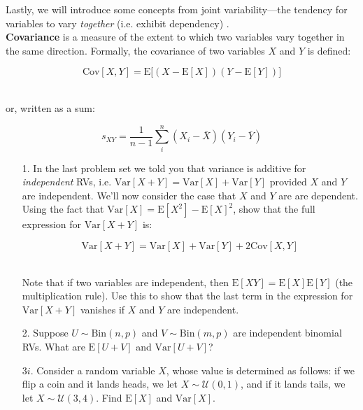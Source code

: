 \documentclass[10pt]{extarticle}
\newcommand{\E}{\text{E}}
\newcommand{\Var}{\text{Var}}
\newcommand{\Cov}{\text{Cov}}
\begin{document}
Lastly, we will introduce some concepts from joint variability---the tendency for variables to vary {\it together} (i.e. exhibit dependency) . \\  

{\bf Covariance} is a measure of the extent to which two variables vary together in the same direction. Formally, the covariance of two variables $X$ and $Y$ is defined:

$$\Cov[X,Y] = \E \big[ (X - \E[X]) (Y - \E[Y] )\big]$$ \ 

or, written as a sum:

$$s_{XY} = \frac{1}{n-1} \sum_i^n (X_i - \bar X)(Y_i - \bar Y)$$ 

\hfill 

\begin{itemize}

	\item[1.] In the last problem set we told you that variance is additive for {\it independent} RVs, i.e. $\Var[X+Y] = \Var[X] + \Var[Y]$ provided $X$ and $Y$ are independent. We'll now consider the case that $X$ and $Y$ are are dependent. \\ 

Using the fact that $\Var[X] = \E[X^2] - \E[X]^2$, show that the full expression for $\Var[X+Y]$ is:

$$\Var[X+Y] = \Var[X] + \Var[Y] + 2\Cov[X,Y]$$ \ 

Note that if two variables are independent, then $\E[XY] = \E[X] \E[Y]$ (the multiplication rule). Use this to show that the last term in the expression for $\Var[X+Y]$ vanishes if $X$ and $Y$ are independent. \\  

	\item[2.] Suppose $U \sim \text{Bin}(n,p)$ and $V \sim \text{Bin}(m,p)$ are independent binomial RVs. What are $\E[U+V]$ and $\Var[U+V]$? \\ 

	\item[3$i$.] Consider a random variable $X$, whose value is determined as follows: if we flip a coin and it lands heads, we let $X \sim \mathcal U(0,1)$, and if it lands tails, we let $X \sim \mathcal U(3,4)$. Find $\E[X]$ and $\Var[X]$.   

\end{itemize} 
\end{document}
